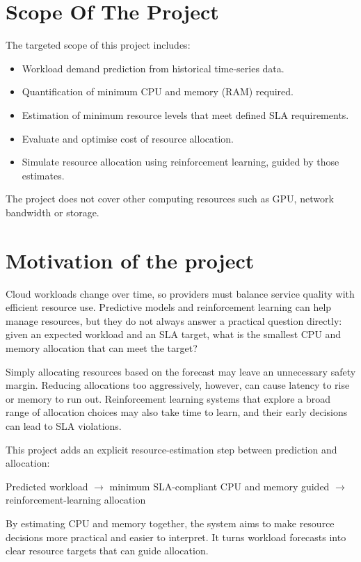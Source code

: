 \documentclass[12pt,a4paper]{report}
\begin{document}
\section{Scope Of The Project}
The targeted scope of this project includes:
\begin{itemize}
    \item Workload demand prediction from historical time-series data.
    \item Quantification of minimum CPU and memory (RAM) required.
    \item Estimation of minimum resource levels that meet defined SLA requirements.
    \item Evaluate and optimise cost of resource allocation.
    \item Simulate resource allocation using reinforcement learning, guided by those estimates.
\end{itemize}
The project does not cover other computing resources such as GPU, network bandwidth or storage.
\lipsum[9-10]

\section{Motivation of the project}
Cloud workloads change over time, so providers must balance service quality with efficient resource use. Predictive models and reinforcement learning can help manage resources, but they do not always answer a practical question directly: given an expected workload and an SLA target, what is the smallest CPU and memory allocation that can meet the target?

Simply allocating resources based on the forecast may leave an unnecessary safety margin. Reducing allocations too aggressively, however, can cause latency to rise or memory to run out. Reinforcement learning systems that explore a broad range of allocation choices may also take time to learn, and their early decisions can lead to SLA violations.

This project adds an explicit resource-estimation step between prediction and allocation:
\begin{center}
    Predicted workload $\rightarrow$ minimum SLA-compliant CPU and memory guided $\rightarrow$ reinforcement-learning allocation
\end{center}

By estimating CPU and memory together, the system aims to make resource decisions more practical and easier to interpret. It turns workload forecasts into clear resource targets that can guide allocation.
\lipsum[11-13]
\end{document}
